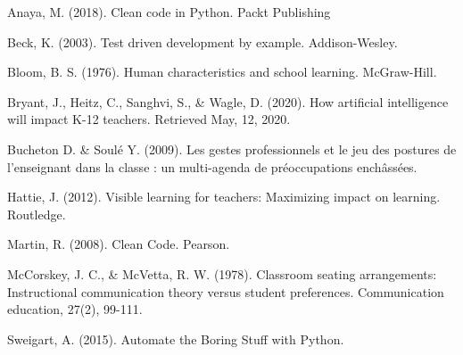\documentclass[10pt]{article}
\begin{document}
\begin{thebibliography}{2}

 Anaya, M. (2018). Clean code in Python. Packt Publishing

 Beck, K. (2003). Test driven development by example. Addison-Wesley.

 Bloom, B. S. (1976). Human characteristics and school learning. McGraw-Hill.

 Bryant, J., Heitz, C., Sanghvi, S., \& Wagle, D. (2020). How artificial intelligence will impact K-12 teachers. Retrieved May, 12, 2020.

 Bucheton D. \& Soulé Y. (2009). Les gestes professionnels et le jeu des postures de l’enseignant dans la classe : un multi-agenda de préoccupations enchâssées.

 Hattie, J. (2012). Visible learning for teachers: Maximizing impact on learning. Routledge.

 Martin, R. (2008). Clean Code. Pearson.

 McCorskey, J. C., \& McVetta, R. W. (1978). Classroom seating arrangements: Instructional communication theory versus student preferences. Communication education, 27(2), 99-111.

 Sweigart, A. (2015). Automate the Boring Stuff with Python.
\end{thebibliography}
\end{document}

